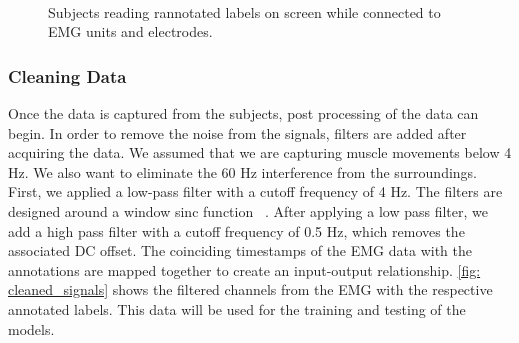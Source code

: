 \documentclass[conference]{IEEEtran}
\begin{document}
\begin{figure}[!b] 
    \centering
    \\
  \caption{Subjects reading rannotated labels on screen while connected to EMG units and electrodes.}
  \label{fig: conn-ann} 
\end{figure}

\subsubsection*{Cleaning Data}
Once the data is captured from the subjects, post processing of the data can begin. In order to remove the noise from the signals, filters are added after acquiring the data. We assumed that we are capturing muscle movements below 4 Hz. We also want to eliminate the 60 Hz interference from the surroundings. First, we applied a low-pass filter with a cutoff frequency of 4 Hz. The filters are designed around a window sinc function ~\cite{noauthor_how_nodate}. After applying a low pass filter, we add a high pass filter with a cutoff frequency of 0.5 Hz, which removes the associated DC offset. The coinciding timestamps of the EMG data with the annotations are mapped together to create an input-output relationship. \figurename \ref{fig: cleaned_signals} shows the filtered channels from the EMG with the respective annotated labels. This data will be used for the training and testing of the models. 
\end{document}

